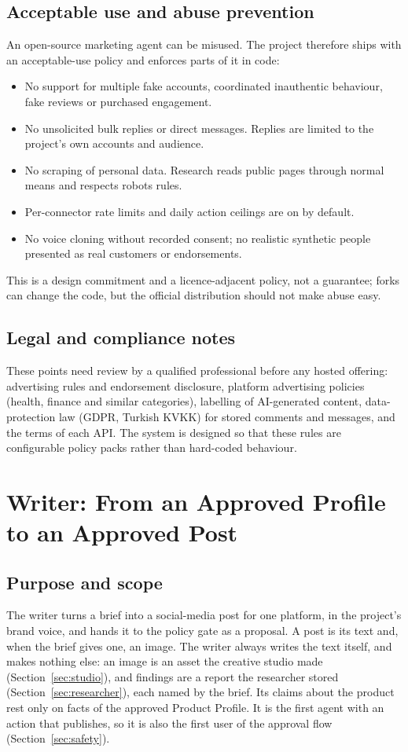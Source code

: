 \documentclass[11pt,a4paper]{article}
\begin{document}
\subsection{Acceptable use and abuse prevention}\label{sec:abuse}
An open-source marketing agent can be misused. The project therefore ships with an acceptable-use policy and enforces parts of it in code:
\begin{itemize}
  \item No support for multiple fake accounts, coordinated inauthentic behaviour, fake reviews or purchased engagement.
  \item No unsolicited bulk replies or direct messages. Replies are limited to the project's own accounts and audience.
  \item No scraping of personal data. Research reads public pages through normal means and respects robots rules.
  \item Per-connector rate limits and daily action ceilings are on by default.
  \item No voice cloning without recorded consent; no realistic synthetic people presented as real customers or endorsements.
\end{itemize}
This is a design commitment and a licence-adjacent policy, not a guarantee; forks can change the code, but the official distribution should not make abuse easy.

\subsection{Legal and compliance notes}
These points need review by a qualified professional before any hosted offering: advertising rules and endorsement disclosure, platform advertising policies (health, finance and similar categories), labelling of AI-generated content, data-protection law (GDPR, Turkish KVKK) for stored comments and messages, and the terms of each API. The system is designed so that these rules are configurable policy packs rather than hard-coded behaviour.

\section{Writer: From an Approved Profile to an Approved Post}\label{sec:writer}

\subsection{Purpose and scope}
The writer turns a brief into a social-media post for one platform, in the project's brand voice, and hands it to the policy gate as a proposal. A post is its text and, when the brief gives one, an image. The writer always writes the text itself, and makes nothing else: an image is an asset the creative studio made (Section~\ref{sec:studio}), and findings are a report the researcher stored (Section~\ref{sec:researcher}), each named by the brief. Its claims about the product rest only on facts of the approved Product Profile. It is the first agent with an action that publishes, so it is also the first user of the approval flow (Section~\ref{sec:safety}).
\end{document}
